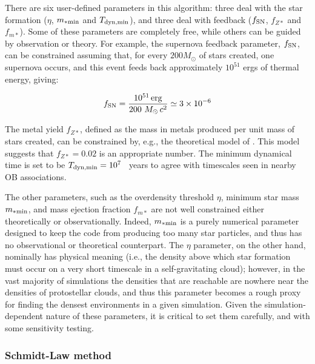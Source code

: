 There are six user-defined parameters in this algorithm: three deal
with the star formation ($\eta$, $m_{\rm *min}$ and $T_{\rm
  dyn,min}$), and three deal with feedback ($f_{\rm SN}$, $f_{Z*}$ and
$f_{m*}$).  Some of these parameters are completely free, while others
can be guided by observation or theory.  For example, the supernova
feedback parameter, $f_{\rm SN}$, can be constrained assuming that, for
every $200 M_\odot$ of stars created, one supernova occurs, and this
event feeds back approximately $10^{51}$ ergs of thermal energy,
giving:

\begin{equation}
f_{\rm SN} = \frac{10^{51}\, \mathrm{erg}}{200~M_\odot\, c^2} \simeq 3 \times 10^{-6}
\end{equation}

The metal yield $f_{Z*}$, defined as the mass in metals produced per
unit mass of stars created, can be constrained by, e.g., the
theoretical model of \citet{1995ApJS..101..181W}.  This model suggests
that $f_{Z*} = 0.02$ is an appropriate number.  The minimum dynamical
time is set to be $T_{\rm dyn,min} = 10^7$ ~years to agree with timescales
seen in nearby OB associations.

The other parameters, such as the overdensity threshold $\eta$,
minimum star mass $m_{\rm *min}$, and mass ejection fraction $f_{m*}$ are
not well constrained either theoretically or observationally.  Indeed,
$m_{\rm *min}$ is a purely numerical parameter designed to keep the code
from producing too many star particles, and thus has no observational
or theoretical counterpart.  The $\eta$ parameter, on the other hand,
nominally has physical meaning (i.e., the density above which star
formation must occur on a very short timescale in a self-gravitating
cloud); however, in the vast majority of simulations the densities
that are reachable are nowhere near the densities of protostellar
clouds, and thus this parameter becomes a rough proxy for finding the
densest environments in a given simulation.  Given the
simulation-dependent nature of these parameters, it is critical to set
them carefully, and with some sensitivity testing.

\subsubsection{Schmidt-Law method}
\label{sec:starform_kravtsov}

